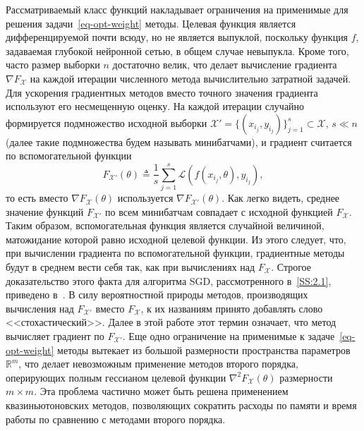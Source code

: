 \documentclass[preprint,12pt]{elsarticle}
\begin{document}
{Рассматриваемый класс функций накладывает ограничения на применимые для решения задачи~\eqref{eq-opt-weight} методы. 
Целевая функция является дифференцируемой почти всюду, но не является выпуклой, поскольку функция $f$, задаваемая глубокой нейронной сетью, в общем случае невыпукла. 
Кроме того, часто размер выборки $n$ достаточно велик, что делает вычисление градиента $\nabla F_\mathcal{X}$ на каждой итерации численного метода вычислительно затратной задачей. 
Для ускорения градиентных методов вместо точного значения градиента используют его несмещенную оценку.
На каждой итерации случайно формируется подмножество исходной выборки $\mathcal{X}' = \{(x_{i_j}, y_{i_j})\}_{j=1}^s \subset \mathcal{X}, \, s \ll n$ (далее такие подмножества будем называть минибатчами), и градиент считается по вспомогательной функции 
\begin{equation}
    F_{\mathcal{X}'}(\theta) \triangleq \frac1s \sum_{j=1}^s \mathcal{L}(f(x_{i_j}, \theta), y_{i_j}),
\end{equation} 
то есть вместо $\nabla F_\mathcal{X}(\theta)$ используется $\nabla F_{\mathcal{X}'}(\theta)$. Как легко видеть, среднее значение функций $F_{\mathcal{X}'}$ по всем минибатчам совпадает с исходной функцией $F_\mathcal{X}$. 
Таким образом, вспомогательная функция является случайной величиной, матожидание которой равно исходной целевой функции. 
Из этого следует, что, при вычислении градиента по вспомогательной функции, градиентные методы будут в среднем вести себя так, как при вычислениях над $F_\mathcal{X}$. 
Строгое доказательство этого факта для алгоритма SGD, рассмотренного в~\ref{SS:2.1}, приведено в~\cite{SGDconvergence}.
В силу вероятностной природы методов, производящих вычисления над $F_{\mathcal{X}'}$ вместо $F_\mathcal{X}$, к их названиям принято добавлять слово <<стохастический>>. Далее в этой работе этот термин означает, что метод вычисляет градиент по $F_{\mathcal{X}'}$. 
Еще одно ограничение на применимые к задаче~\eqref{eq-opt-weight} методы вытекает из большой размерности пространства параметров $\mathbb{R}^m$, что делает невозможным применение методов второго порядка, оперирующих полным гессианом целевой функции $\nabla^2 F_\mathcal{X}(\theta)$ размерности $m \times m$. 
Эта проблема частично может быть решена применением квазиньютоновских методов, позволяющих сократить расходы по памяти и время работы по сравнению с методами второго порядка.

}
\end{document}
